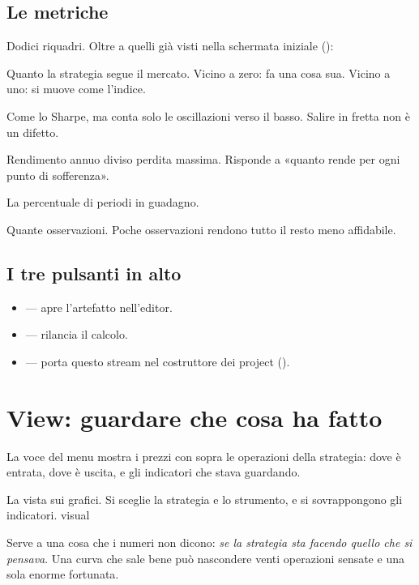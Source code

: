 \subsection{Le metriche}

Dodici riquadri. Oltre a quelli già visti nella schermata iniziale
():

\begin{description}[leftmargin = 1.4em, style = nextline, itemsep = 4pt]
  \item[\voce{Beta vs SPY}] Quanto la strategia segue il mercato. Vicino a
    zero: fa una cosa sua. Vicino a uno: si muove come l'indice.
  \item[\voce{Sortino}] Come lo Sharpe, ma conta solo le oscillazioni verso
    il basso. Salire in fretta non è un difetto.
  \item[\voce{Calmar}] Rendimento annuo diviso perdita massima. Risponde a
    «quanto rende per ogni punto di sofferenza».
  \item[\voce{Hit rate}] La percentuale di periodi in guadagno.
  \item[\voce{N obs}] Quante osservazioni. Poche osservazioni rendono tutto
    il resto meno affidabile.
\end{description}

\subsection{I tre pulsanti in alto}

\begin{itemize}
  \item {} --- apre l'artefatto nell'editor.
  \item {} --- rilancia il calcolo.
  \item {} --- porta questo stream nel
    costruttore dei project ().
\end{itemize}

\section{View: guardare che cosa ha fatto}\label{sez:view}

La voce  del menu mostra i prezzi con sopra le operazioni della
strategia: dove è entrata, dove è uscita, e gli indicatori che stava
guardando.

  {La vista sui grafici. Si sceglie la strategia e lo strumento, e si
   sovrappongono gli indicatori.}
  {visual}

\noindent
Serve a una cosa che i numeri non dicono: \emph{se la strategia sta facendo
quello che si pensava}. Una curva che sale bene può nascondere venti
operazioni sensate e una sola enorme fortunata.
